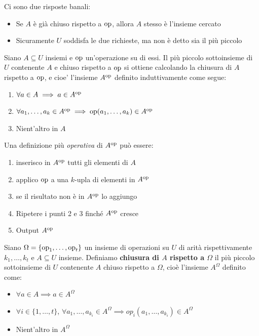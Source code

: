 Ci sono due risposte banali: 
\begin{itemize}
	\item Se $A$ è già chiuso rispetto a $\operatorname{op}$, allora $A$ stesso è l'insieme cercato
	\item Sicuramente $U$ soddisfa le due richieste, ma non è detto sia il più piccolo \\
\end{itemize}

\begin{theor}
	Siano $A \subseteq U$ insiemi e $\operatorname{op}$ un'operazione su di essi. Il più piccolo sottoinsieme di $U$ contenente $A$ e chiuso rispetto a $\operatorname{op}$ si ottiene calcolando la chiusura di $A$ rispetto a $\operatorname{op}$, e cioe' l'insieme $A^{\operatorname{op}}$ definito induttivamente come segue:
\begin{enumerate}
	\item $\forall a \in A \implies a \in A^{\operatorname{op}}$
	\item $\forall a_1, \dots, a_k \in A^{\operatorname{op}} \implies \operatorname{op}(a_1, \dots, a_k) \in A^{\operatorname{op}}$
	\item Nient'altro in $A$
\end{enumerate}
\end{theor}

Una definizione più \textit{operativa} di $A^{\operatorname{op}}$ può essere:
\begin{enumerate}
	\item inserisco in $A^{\operatorname{op}}$ tutti gli elementi di $A$
	\item applico $\operatorname{op}$ a una $k$-upla di elementi in $A^{\operatorname{op}}$
	\item se il risultato non è in $A^{\operatorname{op}}$ lo aggiungo
  	\item Ripetere i punti 2 e 3 finché $A^{\operatorname{op}}$ cresce
	\item Output $A^{\operatorname{op}}$
\end{enumerate}

Siano $\Omega = \{\operatorname{op}_1, \dots, \operatorname{op}_t\}$ un insieme di operazioni su $U$ di arità rispettivamente $k_1, \dots, k_t$ e $A \subseteq U$ insieme. Definiamo \textbf{chiusura di $A$ rispetto a $\Omega$} il più piccolo sottoinsieme di $U$ contenente $A$ chiuso rispetto a $\Omega$, cioè l'insieme $A^\Omega$ definito come:

\newpage

\begin{itemize}
	\item $\forall a \in A \implies a \in A^\Omega$
	\item $\forall i \in \{1, \dots, t\}$, $\forall a_1, \dots, a_{k_i} \in A^\Omega \implies op_i \left(a_1, \dots, a_{k_i}\right) \in A^\Omega$
	\item Nient'altro in $A^\Omega$
\end{itemize}

